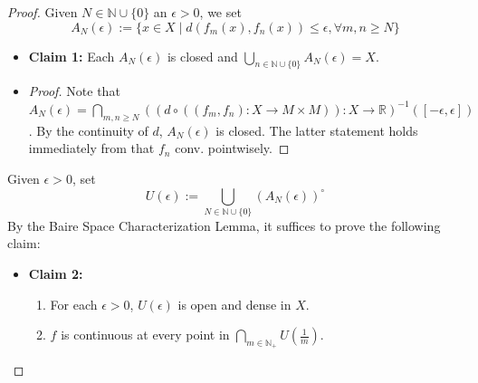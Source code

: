 \begin{proof}
    Given $N \in \mathbb{N} \cup \{0\}$ an $\epsilon>0$, we set
    $$A_N (\epsilon) := \{ x \in X \mid d(f_m(x), f_n(x)) \leq \epsilon, \forall m,n \geq N\}$$

    \begin{itemize}
        \item \textbf{Claim 1:} Each $A_N (\epsilon)$ is closed and $\bigcup_{n \in \mathbb{N} \cup \{ 0\}} A_N(\epsilon) =X$.
        \item \begin{proof}
            Note that $A_N (\epsilon) = \bigcap_{m,n \geq N} ((d \circ ((f_m,f_n):X \to M \times M)): X \to \mathbb{R})^{-1} ([- \epsilon,\epsilon])$. By the continuity of $d$, $A_N(\epsilon)$ is closed. The latter statement holds immediately from that $f_n$ conv. pointwisely.
        \end{proof}
    \end{itemize}

    Given $\epsilon>0$, set
    $$U(\epsilon) := \bigcup_{N \in \mathbb{N} \cup \{0\}} (A_N(\epsilon))^\circ$$
    By the Baire Space Characterization Lemma, it suffices to prove the following claim:

    \begin{itemize}
        \item \textbf{Claim 2:} \begin{enumerate}
            \item For each $\epsilon>0$, $U(\epsilon)$ is open and dense in $X$.
            \item $f$ is continuous at every point in $\bigcap_{m \in \mathbb{N}_+} U(\frac{1}{m})$.
        \end{enumerate}


\end{itemize}
\end{proof}
